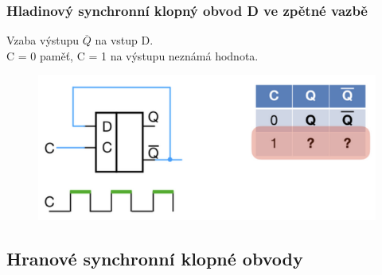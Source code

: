 \subsubsection{Hladinový synchronní klopný obvod D ve zpětné vazbě}
Vzaba výstupu \(\overline{Q}\) na vstup D.\\
C = 0 paměť, C = 1 na výstupu neznámá hodnota.\\
\begin{figure}[h!]
    \centering
    \includegraphics*[scale = 0.5]{img/Dzv.png}
\end{figure}

\subsection{Hranové synchronní klopné obvody}
